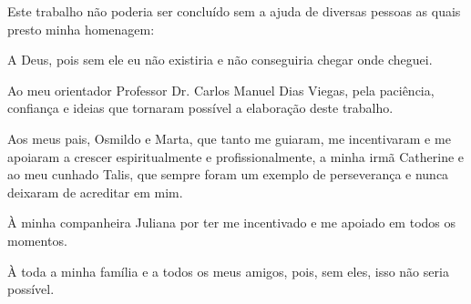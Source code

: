 \begin{agradecimentos}

    Este trabalho não poderia ser concluído sem a ajuda de diversas pessoas as
    quais presto minha homenagem:

    A Deus, pois sem ele eu não existiria e não conseguiria chegar onde cheguei.

    Ao meu orientador Professor Dr. Carlos Manuel Dias Viegas, pela paciência,
    confiança e ideias que tornaram possível a elaboração deste trabalho.

    Aos meus pais, Osmildo e Marta, que tanto me guiaram, me incentivaram e
    me apoiaram a crescer espiritualmente e profissionalmente, a minha irmã Catherine e ao meu cunhado Talis,
    que sempre foram um exemplo de perseverança e nunca deixaram de acreditar em mim.

    À minha companheira Juliana por ter me incentivado e me apoiado em todos
    os momentos.

    À toda a minha família e a todos os meus amigos, pois, sem eles, isso não
    seria possível.

\end{agradecimentos}